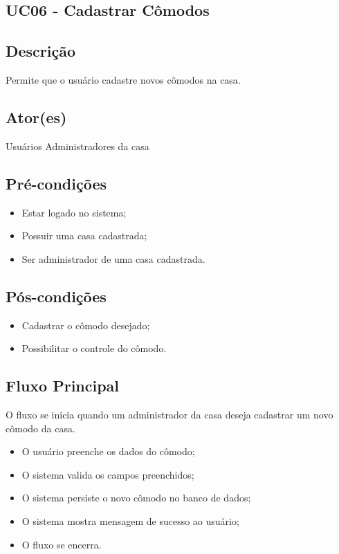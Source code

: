 \begin{anexosenv}
\section{UC06 \-- Cadastrar Cômodos}
    \subsection{Descrição}
        Permite que o usuário cadastre novos cômodos na casa.
    \subsection{Ator(es)}
        Usuários Administradores da casa
    \subsection{Pré-condições}
        \begin{itemize}
            \item Estar logado no sistema;
            \item Possuir uma casa cadastrada;
            \item Ser administrador de uma casa cadastrada.
        \end{itemize}
    \subsection{Pós-condições}
        \begin{itemize}
            \item Cadastrar o cômodo desejado;
            \item Possibilitar o controle do cômodo.
        \end{itemize}
    \subsection{Fluxo Principal}
        O fluxo se inicia quando um administrador da casa deseja cadastrar um novo cômodo da casa.
        \begin{itemize}
            \item O usuário preenche os dados do cômodo;
            \item O sistema valida os campos preenchidos;
            \item O sistema persiste o novo cômodo no banco de dados;
            \item O sistema mostra mensagem de sucesso ao usuário;
            \item O fluxo se encerra.
        \end{itemize}

\end{anexosenv}

